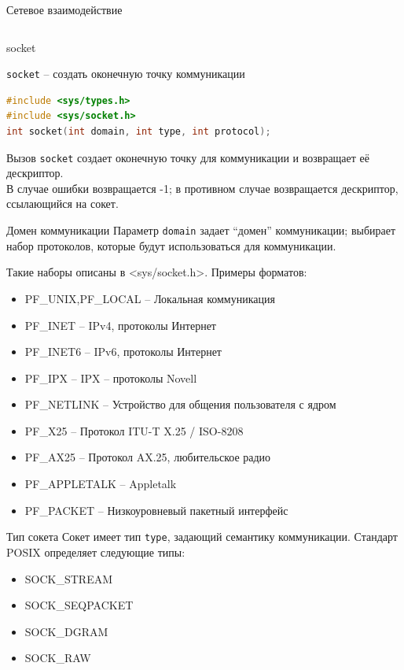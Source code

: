 \begin{frame}{Сетевое взаимодействие}
\begin{columns}
\end{columns}
\end{frame}


\begin{frame}[fragile]{socket}

{\tt socket} -- создать оконечную точку коммуникации   

\scriptsize\begin{lstlisting}[language=C]
#include <sys/types.h> 
#include <sys/socket.h> 
int socket(int domain, int type, int protocol);   
\end{lstlisting}

Вызов {\tt socket} создает оконечную точку для коммуникации и возвращает её дескриптор.\\
В случае ошибки возвращается -1; в противном случае возвращается дескриптор, ссылающийся на сокет. 
\end{frame}

\begin{frame}{Домен коммуникации}
Параметр {\tt domain} задает ``домен'' коммуникации; выбирает набор протоколов, которые будут использоваться для коммуникации.

Такие наборы описаны в <sys/socket.h>. Примеры форматов: 

\begin{itemize}
\item PF\_UNIX,PF\_LOCAL -- Локальная коммуникация
\item PF\_INET --	IPv4, протоколы Интернет
\item PF\_INET6 -- IPv6, протоколы Интернет
\item PF\_IPX -- IPX -- протоколы Novell
\item PF\_NETLINK -- Устройство для общения пользователя с ядром
\item PF\_X25 -- Протокол ITU-T X.25 / ISO-8208
\item PF\_AX25 -- Протокол AX.25, любительское радио 
\item PF\_APPLETALK -- Appletalk
\item PF\_PACKET -- Низкоуровневый пакетный интерфейс
\end{itemize}
\end{frame}

\begin{frame}{Тип сокета}
Сокет имеет тип {\tt type}, задающий семантику коммуникации. Стандарт POSIX определяет следующие типы:

\begin{itemize}
	\item SOCK\_STREAM 
	\item SOCK\_SEQPACKET
	\item SOCK\_DGRAM
	\item SOCK\_RAW
\end{itemize}
\end{frame}

